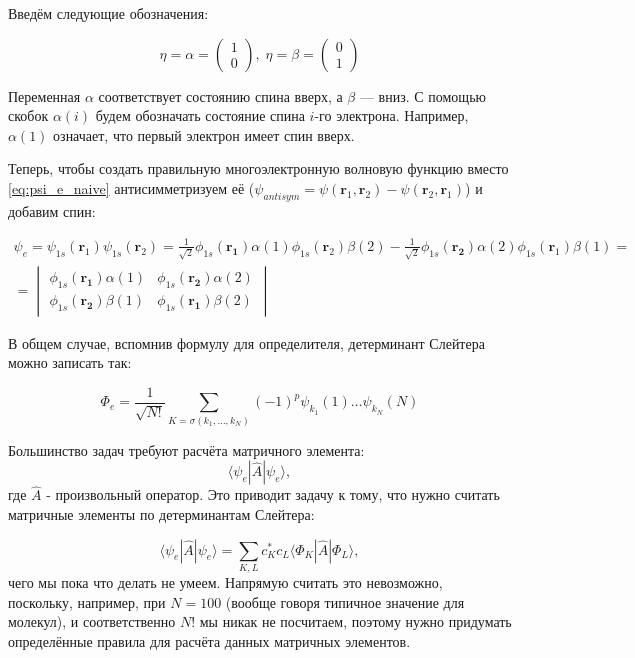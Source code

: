 \documentclass[12pt, oneside]{article}
\numberwithin{equation}{section}  %
\begin{document}
Введём следующие обозначения:

\begin{equation}
    \eta = \alpha = \begin{pmatrix} 1 \\ 0 \end{pmatrix}, \;
    \eta = \beta = \begin{pmatrix} 0 \\ 1 \end{pmatrix}
\end{equation}

Переменная \(\alpha\) соответствует состоянию спина вверх, а \(\beta\) — вниз. С помощью скобок \(\alpha(i)\) будем обозначать состояние спина \(i\)-го электрона. Например, \(\alpha(1)\) означает, что первый электрон имеет спин вверх. 

Теперь, чтобы создать правильную многоэлектронную волновую функцию вместо \eqref{eq:psi_e_naive} антисимметризуем её (\(\psi_{antisym} = \psi(\bm{r}_1, \bm{r}_2) - \psi(\bm{r}_2, \bm{r}_1)\)) и добавим спин:

\begin{multline}
\psi_e = \psi_{1s} (\bm{r}_1) \psi_{1s} (\bm{r}_2) = \frac{1}{\sqrt{2}} \phi_{1s} (\bm{r_1}) \alpha(1) \phi_{1s} (\bm{r}_2) \beta(2) - \frac{1}{\sqrt{2}} \phi_{1s} (\bm{r_2}) \alpha(2) \phi_{1s} (\bm{r}_1) \beta(1) =\\=
\begin{vmatrix}
\phi_{1s} (\bm{r_1}) \alpha(1) & \phi_{1s} (\bm{r_2}) \alpha(2) \\
\phi_{1s} (\bm{r_2}) \beta(1) & \phi_{1s} (\bm{r_1}) \beta(2)
\end{vmatrix}
\end{multline}

В общем случае, вспомнив формулу для определителя, детерминант Слейтера можно записать так:

\begin{equation}
    \Phi_e = \dfrac{1}{\sqrt{N!}} \sum_{K = \sigma(k_1, \dots, k_N)} (-1)^p \psi_{k_1} (1) \dots \psi_{k_N} (N)
\end{equation}

Большинство задач требуют расчёта матричного элемента:
\begin{equation}
    \langle \psi_e | \hat{A} | \psi_e \rangle,
\end{equation}
где \(\hat{A}\) - произвольный оператор. Это приводит задачу к тому, что нужно считать матричные элементы по детерминантам Слейтера:

\begin{equation}
\langle \psi_e | \hat{A} | \psi_e \rangle = \sum_{K, L} c_K^* c_L \langle \Phi_K | \hat{A} | \Phi_L \rangle,
\end{equation}
чего мы пока что делать не умеем. Напрямую считать это невозможно, поскольку, например, при \(N = 100\) (вообще говоря типичное значение для молекул), и соответственно \(N!\) мы никак не посчитаем, поэтому нужно придумать определённые правила для расчёта данных матричных элементов.
\end{document}
